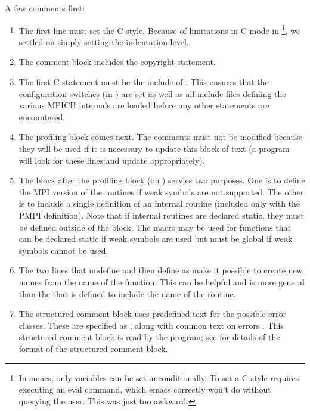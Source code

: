 \documentclass{article}
\begin{document}
A few comments first:
\begin{enumerate}
\item The first line must set the C style.  Because of limitations in
C mode in \footnote{In emacs, only variables can be set
unconditionally.  To set a C style requires executing an eval command,
which emacs correctly won't do without querying the user.  This was
just too awkward.}, we settled on simply setting the indentation level.

\item The comment block includes the copyright statement.

\item The first C statement must be the include of .  This
  ensures that the configuration switches (in ) are set as
  well as all include files defining the various MPICH internals are loaded
  before any other statements are encountered.

\item The profiling block comes next.  The comments must not be modified
  because they will be used if it is necessary to update this block of text (a
  program will look for these lines and update appropriately).

\item The block after the profiling block (on )
  servies two purposes.  One is to define the MPI version of the routines if
  weak symbols are not supported.  The other is to include a single definition
  of an internal routine (included only with the PMPI definition).
  Note that if internal routines are declared static, they must be
  defined outside of the  block.  
  The macro  may be used for
  functions that can be 
  declared static if weak symbols are used but must be global if weak
  symbols cannot be used.

\item The two lines that undefine  and then define
   as  make it possible to create new names
  from the name of the function.  This can be helpful and is more
  general than the  that is defined to include
  the name of the routine.
  
\item The structured comment block uses predefined text for the possible error
  classes.  These are specified as , along with common text on
  errors .  This structured comment block is read by
  the  program; see \cite{doctext} for details of the
  format of the structured comment block.


\end{enumerate}
\end{document}
